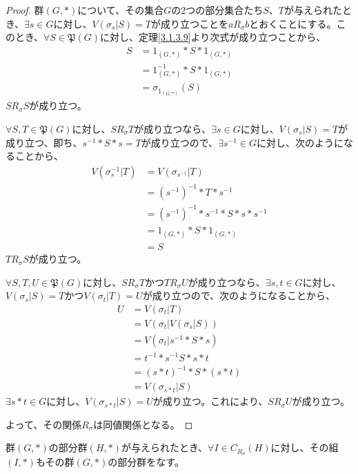 \documentclass[dvipdfmx]{jsarticle}
\begin{document}
\begin{proof}
群$(G,*)$について、その集合$G$の2つの部分集合たち$S$、$T$が与えられたとき、$\exists s \in G$に対し、$V\left( \sigma_{s}|S \right) = T$が成り立つことを$aR_{\sigma}b$とおくことにする。このとき、$\forall S \in \mathfrak{P}(G)$に対し、定理\ref{3.1.3.9}より次式が成り立つことから、
\begin{align*}
S &= 1_{(G,*)}*S*1_{(G,*)}\\
&= 1_{(G,*)}^{- 1}*S*1_{(G,*)}\\
&= \sigma_{1_{(G,*)}}(S)
\end{align*}
$SR_{\sigma}S$が成り立つ。\par
$\forall S,T \in \mathfrak{P}(G)$に対し、$SR_{\sigma}T$が成り立つなら、$\exists s \in G$に対し、$V\left( \sigma_{s}|S \right) = T$が成り立つ、即ち、$s^{- 1}*S*s = T$が成り立つので、$\exists s^{- 1} \in G$に対し、次のようになることから、
\begin{align*}
V\left( \sigma_{s}^{- 1}|T \right) &= V\left( \sigma_{s^{- 1}}|T \right)\\
&= \left( s^{- 1} \right)^{- 1}*T*s^{- 1}\\
&= \left( s^{- 1} \right)^{- 1}*s^{- 1}*S*s*s^{- 1}\\
&= 1_{(G,*)}*S*1_{(G,*)}\\
&= S
\end{align*}
$TR_{\sigma}S$が成り立つ。\par
$\forall S,T,U \in \mathfrak{P}(G)$に対し、$SR_{\sigma}T$かつ$TR_{\sigma}U$が成り立つなら、$\exists s,t \in G$に対し、$V\left( \sigma_{s}|S \right) = T$かつ$V\left( \sigma_{t}|T \right) = U$が成り立つので、次のようになることから、
\begin{align*}
U &= V\left( \sigma_{t}|T \right)\\
&= V\left( \sigma_{t}|V\left( \sigma_{s}|S \right) \right)\\
&= V\left( \sigma_{t}|s^{- 1}*S*s \right)\\
&= t^{- 1}*s^{- 1}S*s*t\\
&= (s*t)^{- 1}*S*(s*t)\\
&= V\left( \sigma_{s*t}|S \right)
\end{align*}
$\exists s*t \in G$に対し、$V\left( \sigma_{s*t}|S \right) = U$が成り立つ。これにより、$SR_{\sigma}U$が成り立つ。\par
よって、その関係$R_{\sigma}$は同値関係となる。
\end{proof}
\begin{thm}\label{3.1.3.11}
群$(G,*)$の部分群$(H,*)$が与えられたとき、$\forall I \in C_{R_{\sigma}}(H)$に対し、その組$(I,*)$もその群$(G,*)$の部分群をなす。
\end{thm}
\end{document}
